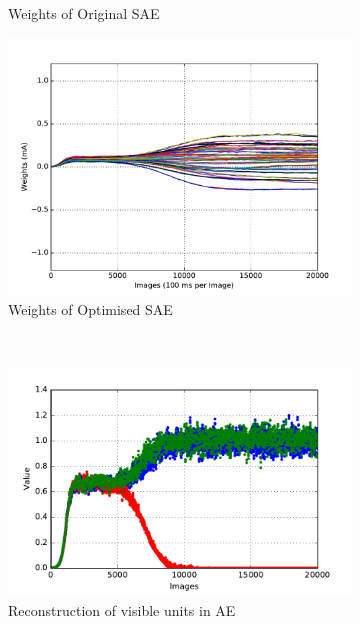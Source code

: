 \begin{figure}
\begin{subfigure}[t]{0.32\textwidth}
		\caption{Weights of Original SAE}
	\end{subfigure}
	\begin{subfigure}[t]{0.32\textwidth}
		\includegraphics[width=\textwidth]{pics_sdlm/07_exp_SAE_all_long/exp3_weights_s.pdf}
		\caption{Weights of Optimised SAE}
	\end{subfigure}\\
	\begin{subfigure}[t]{0.32\textwidth}
		\includegraphics[width=\textwidth]{pics_sdlm/21_exp_AE_noise/exp3_recon_s2.pdf}
		\caption{Reconstruction of visible units in AE}
	\end{subfigure}
	\begin{subfigure}[t]{0.32\textwidth}

\end{subfigure}
\end{figure}
